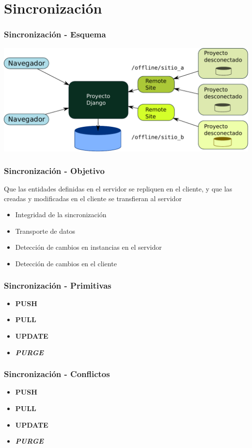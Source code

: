 \documentclass{beamer}
\begin{document}
\section{Sincronización}
\begin{frame}
    \frametitle{Sincronización - Esquema}
    \includegraphics[scale=0.5]{esquema_distribuido.pdf}
\end{frame}

\begin{frame}
    \frametitle{Sincronización - Objetivo}
    \par {
    	Que las entidades definidas en el servidor se repliquen en el cliente, y
    	que las creadas y modificadas en el cliente se transfieran al servidor
    }
    \begin{itemize}
        \item Integridad de la sincronización
		\item Transporte de datos
		\item Detección de cambios en instancias en el servidor
		\item Detección de cambios en el cliente
    \end{itemize}
\end{frame}

\begin{frame}
    \frametitle{Sincronización - Primitivas}
    \begin{itemize}
        \item {\bf PUSH}
        \item {\bf PULL}
        \item {\bf UPDATE}
        \item \textit{\bf PURGE}
    \end{itemize}
\end{frame}

\begin{frame}
    \frametitle{Sincronización - Conflictos}
    \begin{itemize}
        \item {\bf PUSH}
        \item {\bf PULL}
        \item {\bf UPDATE}
        \item \textit{\bf PURGE}
    \end{itemize}
\end{frame}
\end{document}
